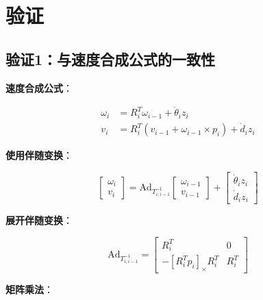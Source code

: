 \documentclass[12pt,a4paper]{article}
\begin{document}
\section{验证}

\subsection{验证1：与速度合成公式的一致性}

\textbf{速度合成公式}：

\begin{align}
\omega_i &= R_i^T \omega_{i-1} + \dot{\theta}_i z_i \tag{22} \\
v_i &= R_i^T (v_{i-1} + \omega_{i-1} \times p_i) + \dot{d}_i z_i \tag{23}
\end{align}

\textbf{使用伴随变换}：

\begin{equation}
\begin{bmatrix} \omega_i \\ v_i \end{bmatrix} = \text{Ad}_{T_{i,i-1}^{-1}} \begin{bmatrix} \omega_{i-1} \\ v_{i-1} \end{bmatrix} + \begin{bmatrix} \dot{\theta}_i z_i \\ \dot{d}_i z_i \end{bmatrix} \tag{21}
\end{equation}

\textbf{展开伴随变换}：

\begin{equation}
\text{Ad}_{T_{i,i-1}^{-1}} = \begin{bmatrix}
R_i^T & 0 \\
-[R_i^T p_i]_{\times} R_i^T & R_i^T
\end{bmatrix}
\end{equation}

\textbf{矩阵乘法}：
\end{document}
